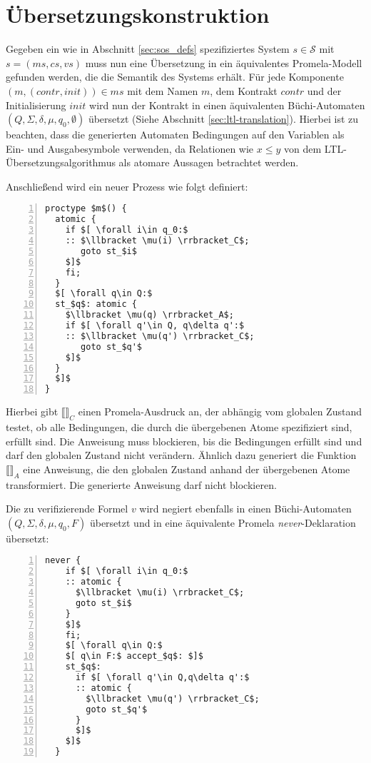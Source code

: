 \section{Übersetzungskonstruktion}
Gegeben ein wie in Abschnitt \ref{sec:sos_defs} spezifiziertes System $s\in \mathcal{S}$ mit $s=(ms,cs,vs)$ muss nun eine Übersetzung in ein äquivalentes Promela-Modell gefunden werden, die die Semantik des Systems erhält.
Für jede Komponente $(m,(\mathit{contr},\mathit{init}))\in ms$ mit dem Namen $m$, dem Kontrakt $\mathit{contr}$ und der Initialisierung $\mathit{init}$ wird nun der Kontrakt in einen äquivalenten Büchi-Automaten $(Q,\Sigma,\delta,\mu,q_0,\emptyset)$ übersetzt (Siehe Abschnitt \ref{sec:ltl-translation}).
Hierbei ist zu beachten, dass die generierten Automaten Bedingungen auf den Variablen als Ein- und Ausgabesymbole verwenden, da Relationen wie $x\leq y$ von dem LTL-Übersetzungsalgorithmus als atomare Aussagen betrachtet werden.


Anschließend wird ein neuer Prozess wie folgt definiert:
\begin{lstlisting}[language=Promela,mathescape=true,numbers=left,numberstyle=\small]
proctype $m$() {
  atomic {
    if $[ \forall i\in q_0:$
    :: $\llbracket \mu(i) \rrbracket_C$;
       goto st_$i$
    $]$
    fi;
  }
  $[ \forall q\in Q:$
  st_$q$: atomic {
    $\llbracket \mu(q) \rrbracket_A$;
    if $[ \forall q'\in Q, q\delta q':$
    :: $\llbracket \mu(q') \rrbracket_C$;
       goto st_$q'$
    $]$
  }
  $]$
}
\end{lstlisting}
Hierbei gibt $\llbracket\rrbracket_C$ einen Promela-Ausdruck an, der abhängig vom globalen Zustand testet, ob alle Bedingungen, die durch die übergebenen Atome spezifiziert sind, erfüllt sind.
Die Anweisung muss blockieren, bis die Bedingungen erfüllt sind und darf den globalen Zustand nicht verändern.
Ähnlich dazu generiert die Funktion $\llbracket\rrbracket_A$ eine Anweisung, die den globalen Zustand anhand der übergebenen Atome transformiert.
Die generierte Anweisung darf nicht blockieren.

Die zu verifizierende Formel $v$ wird negiert ebenfalls in einen Büchi-Automaten $(Q,\Sigma,\delta,\mu,q_0,F)$ übersetzt und in eine äquivalente Promela \emph{never}-Deklaration übersetzt:
\begin{lstlisting}[language=Promela,mathescape=true,numbers=left,numberstyle=\small]
  never {
    if $[ \forall i\in q_0:$
    :: atomic {
      $\llbracket \mu(i) \rrbracket_C$;
      goto st_$i$
    }
    $]$
    fi;
    $[ \forall q\in Q:$
    $[ q\in F:$ accept_$q$: $]$
    st_$q$:
      if $[ \forall q'\in Q,q\delta q':$
      :: atomic {
        $\llbracket \mu(q') \rrbracket_C$;
        goto st_$q'$
      }
      $]$
    $]$
  }
\end{lstlisting}

